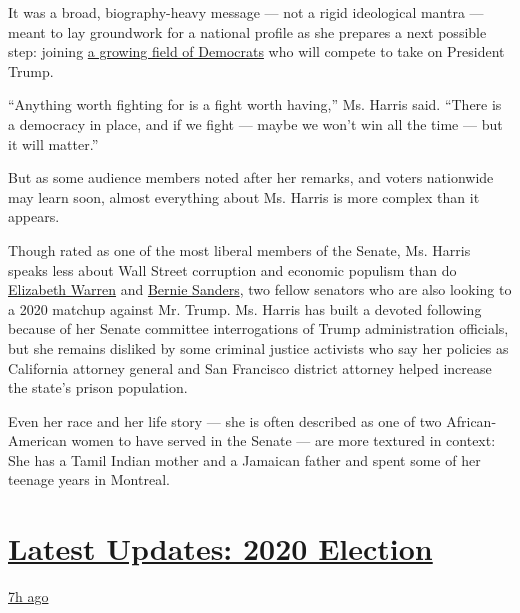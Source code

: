 It was a broad, biography-heavy message --- not a rigid ideological
mantra --- meant to lay groundwork for a national profile as she
prepares a next possible step: joining
\href{https://www.nytimes3xbfgragh.onion/2019/01/11/us/politics/tulsi-gabbard-2020-president-announcement.html}{a
growing field of Democrats} who will compete to take on President Trump.

``Anything worth fighting for is a fight worth having,'' Ms. Harris
said. ``There is a democracy in place, and if we fight --- maybe we
won't win all the time --- but it will matter.''

But as some audience members noted after her remarks, and voters
nationwide may learn soon, almost everything about Ms. Harris is more
complex than it appears.

Though rated as one of the most liberal members of the Senate, Ms.
Harris speaks less about Wall Street corruption and economic populism
than do
\href{https://www.nytimes3xbfgragh.onion/2019/01/04/us/politics/elizabeth-warren-iowa.html}{Elizabeth
Warren} and
\href{https://www.nytimes3xbfgragh.onion/2018/11/23/us/politics/bernie-sanders-president-2020.html}{Bernie
Sanders}, two fellow senators who are also looking to a 2020 matchup
against Mr. Trump. Ms. Harris has built a devoted following because of
her Senate committee interrogations of Trump administration officials,
but she remains disliked by some criminal justice activists who say her
policies as California attorney general and San Francisco district
attorney helped increase the state's prison population.

Even her race and her life story --- she is often described as one of
two African-American women to have served in the Senate --- are more
textured in context: She has a Tamil Indian mother and a Jamaican father
and spent some of her teenage years in Montreal.

\hypertarget{latest-updates-2020-election}{%
\section{\texorpdfstring{\href{https://www.nytimes3xbfgragh.onion/live/2020/08/19/us/dnc-convention-election?action=click\&pgtype=Article\&state=default\&region=MAIN_CONTENT_1\&context=storylines_live_updates}{Latest
Updates: 2020
Election}}{Latest Updates: 2020 Election}}\label{latest-updates-2020-election}}

\href{https://www.nytimes3xbfgragh.onion/live/2020/08/19/us/dnc-convention-election?action=click\&pgtype=Article\&state=default\&region=MAIN_CONTENT_1\&context=storylines_live_updates\#night-3-featured-more-policy-a-focus-on-women-and-a-full-throated-rejection-of-trump-by-his-predecessor}{7h
ago}

